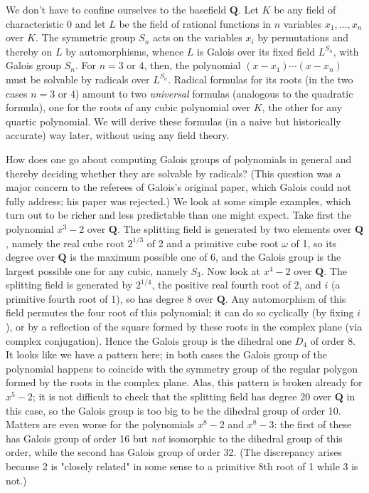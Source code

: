 \documentclass[10pt]{article}
\begin{document}
We don't have to confine ourselves to the basefield $\mathbf Q$. Let $K$
be any field of characteristic 0 and let $L$ be the field of rational
functions in $n$ variables $x_1,\ldots,x_n$ over $K$. The symmetric
group $S_n$ acts on the variables $x_i$ by permutations and thereby on
$L$ by automorphisms, whence $L$ is Galois over its fixed field
$L^{S_n}$, with Galois group $S_n$. For $n=3$ or 4, then, the polynomial
$(x-x_1)\cdots(x-x_n)$ must be solvable by radicals over $L^{S_n}$.
Radical formulas for its roots (in the two cases $n=3$ or 4) amount to
two {\sl universal} formulas (analogous to the quadratic formula), one
for the roots of any cubic polynomial over $K$, the other for any
quartic polynomial. We will derive these formulas (in a naive but
historically accurate) way later, without using any field theory.

How does one go about computing Galois groups of polynomials in general
and thereby deciding whether they are solvable by radicals? (This
question was a major concern to the referees of Galois's original paper,
which Galois could not fully address; his paper was rejected.) We look
at some simple examples, which turn out to be richer and less
predictable than one might expect. Take first the polynomial $x^3 - 2$
over $\mathbf Q$. The splitting field is generated by two elements over
$\mathbf Q$, namely the real cube root $2^{1/3}$ of 2 and a primitive
cube root $\omega$ of 1, so its degree over $\mathbf Q$ is the maximum
possible one of 6, and the Galois group is the largest possible one for
any cubic, namely $S_3$. Now look at $x^4 - 2$ over $\mathbf Q$. The
splitting field is generated by $2^{1/4}$, the positive real fourth root
of 2, and $i$ (a primitive fourth root of 1), so has degree 8 over
$\mathbf Q$. Any automorphism of this field permutes the four root of
this polynomial; it can do so cyclically (by fixing $i$), or by a
reflection of the square formed by these roots in the complex plane (via
complex conjugation). Hence the Galois group is the dihedral one $D_4$
of order 8. It looks like we have a pattern here; in both cases the
Galois group of the polynomial happens to coincide with the symmetry
group of the regular polygon formed by the roots in the complex plane.
Alas, this pattern is broken already for $x^5 - 2$; it is not difficult
to check that the splitting field has degree 20 over $\mathbf Q$ in this
case, so the Galois group is too big to be the dihedral group of order
10. Matters are even worse for the polynomials $x^8 - 2$ and $x^8 - 3$:
the first of these has Galois group of order 16 but {\sl not} isomorphic
to the dihedral group of this order, while the second has Galois group
of order 32. (The discrepancy arises because 2 is "closely related" in
some sense to a primitive 8th root of 1 while 3 is not.)
\end{document}

